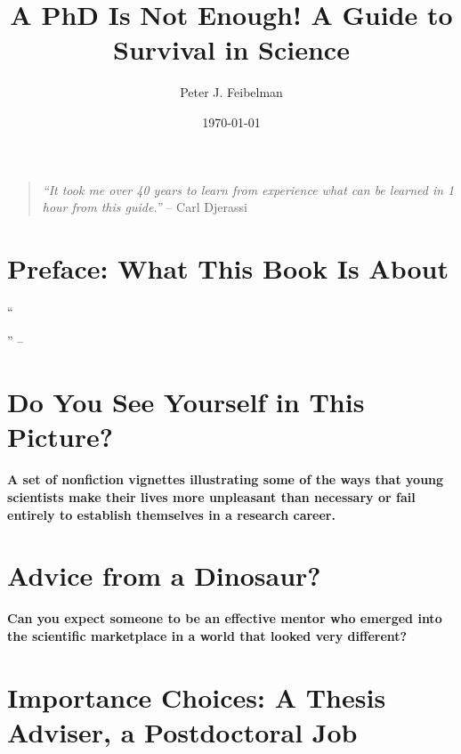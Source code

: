 \documentclass{article}
\title{A PhD Is Not Enough! A Guide to Survival in Science}
\author{Peter J. Feibelman}
\date{\today}
\numberwithin{equation}{section}
\begin{document}
\maketitle
\tableofcontents
\vspace{5mm}
\begin{quotation}
	\textit{``It took me over 40 years to learn from experience what can be learned in 1 hour from this guide.''} -- Carl Djerassi
\end{quotation}


\section*{Preface: What This Book Is About}
``

'' -- \cite{Feibelman2011}


\section{Do You See Yourself in This Picture?}

\begin{center}
	\textsf{\textbf{A set of nonfiction vignettes illustrating some of the ways that young scientists make their lives more unpleasant than necessary or fail entirely to establish themselves in a research career.}}
\end{center}


\section{Advice from a Dinosaur?}

\begin{center}
	\textsf{\textbf{Can you expect someone to be an effective mentor who emerged into the scientific marketplace in a world that looked very different?}}
\end{center}


\section{Importance Choices: A Thesis Adviser, a Postdoctoral Job}
\end{document}
